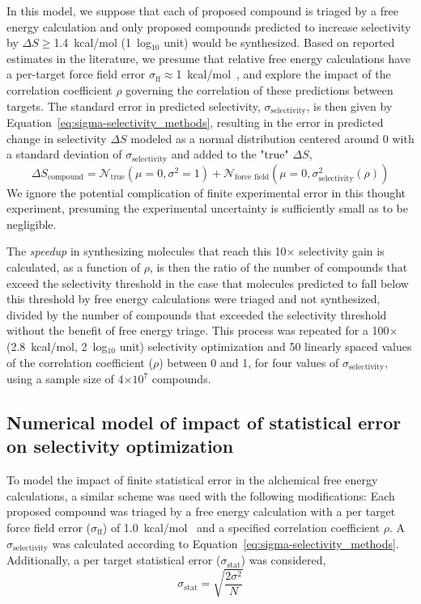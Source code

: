 \documentclass[phd,tocprelim]{cornell}
\begin{document}
In this model, we suppose that each of proposed compound is triaged by a free energy calculation and only proposed compounds predicted to increase selectivity by $\Delta S \ge $1.4~kcal/mol (1~log$_{10}$ unit) would be synthesized.
Based on reported estimates in the literature, 
we presume that relative free energy calculations have a per-target force field error $\sigma_\text{ff} \approx $1~kcal/mol~\citep{Harder:J.Chem.TheoryComput.:2016}, and explore the impact of the correlation coefficient $\rho$ governing the correlation of these predictions between targets. 
The standard error in predicted selectivity, $\sigma_\text{selectivity}$, is then given by Equation~\ref{eq:sigma-selectivity_methods}, resulting in the error in predicted change in selectivity $\Delta S$ modeled as a normal distribution centered around 0 with a standard deviation of $\sigma_\text{selectivity}$ and added to the "true" $\Delta S$,
\begin{equation}\label{eq14}
\Delta S_\text{compound} = \mathcal{N}_\text{true}(\mu =0, \sigma^2 = 1) + \mathcal{N}_\text{force field}(\mu =0, \sigma_\text{selectivity}^2(\rho))
\end{equation}
We ignore the potential complication of finite experimental error in this thought experiment, presuming the experimental uncertainty is sufficiently small as to be negligible.

The \emph{speedup} in synthesizing molecules that reach this 10$\times$ selectivity gain is calculated, as a function of $\rho$, is then the ratio of the number of compounds that exceed the selectivity threshold in the case that molecules predicted to fall below this threshold by free energy calculations were triaged and not synthesized, divided by the number of compounds that exceeded the selectivity threshold without the benefit of free energy triage.
This process was repeated for a 100$\times$ (2.8~kcal/mol, 2~log$_{10}$ unit) selectivity optimization and 50 linearly spaced values of the correlation coefficient ($\rho$) between 0 and 1, for four values of $\sigma_\text{selectivity}$, using a sample size of 4$\times10^7$ compounds. 

\subsection{Numerical model of impact of statistical error on selectivity optimization}

To model the impact of finite statistical error in the alchemical free energy calculations, a similar scheme was used with the following modifications:
Each proposed compound was triaged by a free energy calculation with a per target force field error ($\sigma_\text{ff}$) of 1.0~kcal/mol~\citep{Harder:J.Chem.TheoryComput.:2016}
and a specified correlation coefficient $\rho$.  
A $\sigma_\text{selectivity}$ was calculated according to Equation~\ref{eq:sigma-selectivity_methods}. 
Additionally, a per target statistical error ($\sigma_\text{stat}$) was considered, 
\begin{equation}\label{eq15}
\sigma_\text{stat} = \sqrt{\frac{2\sigma^2}{N}}
\end{equation}
\end{document}
